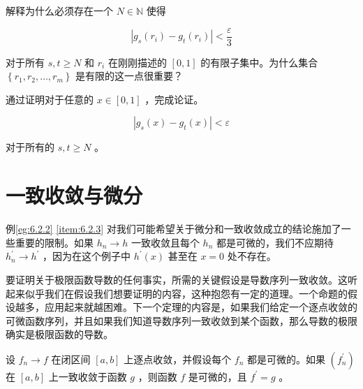 解释为什么必须存在一个 \(N \in  \mathbb{N}\) 使得

\[
\left| {{g}_{s}\left( {r}_{i}\right)  - {g}_{t}\left( {r}_{i}\right) }\right|  < \frac{\varepsilon }{3}
\]

对于所有 \(s,t \geq  N\) 和 \({r}_{i}\) 在刚刚描述的 \(\left\lbrack  {0,1}\right\rbrack\) 的有限子集中。为什么集合 \(\left\{  {{r}_{1},{r}_{2},\ldots ,{r}_{m}}\right\}\) 是有限的这一点很重要？

通过证明对于任意的 \(x \in  \left\lbrack  {0,1}\right\rbrack\) ，完成论证。

\[
\left| {{g}_{s}\left( x\right)  - {g}_{t}\left( x\right) }\right|  < \varepsilon
\]

对于所有的 \(s,t \geq  N\) 。

\section{一致收敛与微分}
\label{sec:6.3}
例\ref{eg:6.2.2} \ref{item:6.2.3} 对我们可能希望关于微分和一致收敛成立的结论施加了一些重要的限制。如果 \({h}_{n} \rightarrow  h\) 一致收敛且每个 \({h}_{n}\) 都是可微的，我们不应期待 \({h}_{n}^{\prime } \rightarrow  {h}^{\prime }\) ，因为在这个例子中 \({h}^{\prime }\left( x\right)\) 甚至在 \(x = 0\) 处不存在。

要证明关于极限函数导数的任何事实，所需的关键假设是导数序列一致收敛。这听起来似乎我们在假设我们想要证明的内容，这种抱怨有一定的道理。一个命题的假设越多，应用起来就越困难。下一个定理的内容是，如果我们给定一个逐点收敛的可微函数序列，并且如果我们知道导数序列一致收敛到某个函数，那么导数的极限确实是极限函数的导数。


\begin{Thm}\label{thm:6.3.1}
  设 \({f}_{n} \rightarrow  f\) 在闭区间 \(\left\lbrack  {a,b}\right\rbrack\) 上逐点收敛，并假设每个 \({f}_{n}\) 都是可微的。如果 \(\left( {f}_{n}^{\prime }\right)\) 在 \(\left\lbrack  {a,b}\right\rbrack\) 上一致收敛于函数 \(g\) ，则函数 \(f\) 是可微的，且 \({f}^{\prime } = g\) 。
\end{Thm}

